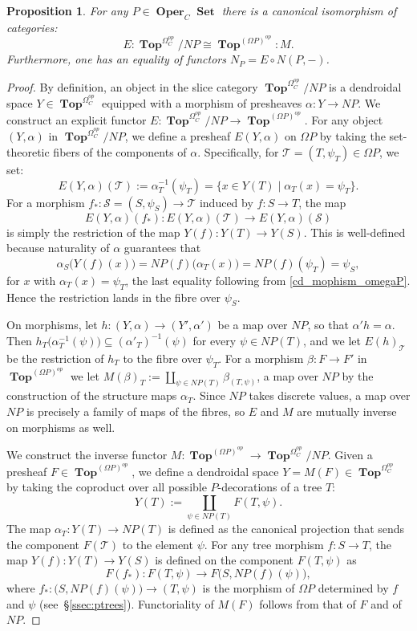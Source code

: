 \documentclass{amsart}
\newtheorem{proposition}[formula]{Proposition}
\theoremstyle{definition}
\theoremstyle{remark}
\newcommand{\lb}{\lbrace}
\newcommand{\rb}{\rbrace}
\DeclareMathOperator{\Top}{\mathbf{Top}}
\DeclareMathOperator{\Set}{\mathbf{Set}}
\DeclareMathOperator{\Oper}{\mathbf{Oper}}
\newcommand{\rcolon}{\mathrel{}\colon\!}
\begin{document}
	\begin{proposition}\label{pr:algneriso}
		For any $P\in\Oper_{C}\Set$ there is a canonical isomorphism of categories:
		\[
			E\colon \Top^{\Omega^{op}_{C}} / NP \cong \Top^{(\Omega 	P)^{op}}\rcolon M.
		\]	
		Furthermore, one has an equality of functors $N_{P}=E\circ N(P,-)$.
	\end{proposition}
	\begin{proof}
	By definition, an object in the slice category $\Top^{\Omega^{op}_{C}} / NP$ is a dendroidal space $Y\in \Top^{\Omega_{C}^{op}}$ equipped with a morphism of presheaves $\alpha\colon Y \to NP$. 
	We construct an explicit functor $E\colon \Top^{\Omega_{C}^{op}} / NP \to \Top^{(\Omega P)^{op}}$. 
	For any object $(Y, \alpha)$ in $\Top^{\Omega_{C}^{op}} / NP$, we define a presheaf $E(Y,\alpha)$ on $\Omega P$ by taking the set-theoretic fibers of the components of $\alpha$. 
	Specifically, for $\mathcal{T}=(T, \psi_{T}) \in \Omega P$, we set:
	\[
		E(Y,\alpha)(\mathcal{T}) := 	\alpha_T^{-1}(\psi_{T}) = \lb x \in 	Y(T) \mid \alpha_T(x) = \psi_{T} \rb.
	\]
	For a morphism $f_{*}\colon \mathcal{S}=(S,\psi_{S}) \to \mathcal{T}$ induced by $f\colon S\to T$, the map 
	\[
		E(Y,\alpha)(f_{*})\colon E(Y,\alpha)(\mathcal{T}) \to E(Y,\alpha)(\mathcal{S})
	\] 
	is simply the restriction of the map $Y(f)\colon Y(T) \to Y(S)$. 
	This is well-defined because naturality of $\alpha$ guarantees that 
	\[
		\alpha_S\bigl(Y(f)(x)\bigr)=NP(f)\bigl(\alpha_T(x)\bigr)=NP(f)(\psi_T)=\psi_S,
	\]
	for $x$ with $\alpha_T(x)=\psi_T$, the last equality following from \eqref{cd_mophism_omegaP}. 
	Hence the
	restriction lands in the fibre over $\psi_S$.
	
	On morphisms, let $h\colon (Y,\alpha)\to (Y',\alpha')$ be a map over $NP$, so
	that $\alpha'h=\alpha$. 
	Then $h_T\bigl(\alpha_T^{-1}(\psi)\bigr)\subseteq
	(\alpha'_T)^{-1}(\psi)$ for every $\psi\in NP(T)$, and we let
	$E(h)_{\mathcal{T}}$ be the restriction of $h_T$ to the fibre over $\psi_T$.
	For a morphism $\beta\colon F\to F'$ in $\Top^{(\Omega P)^{op}}$ we let
	$M(\beta)_T:=\coprod_{\psi\in NP(T)}\beta_{(T,\psi)}$, a map over $NP$ by the
	construction of the structure maps $\alpha_T$. 
	Since $NP$ takes discrete
	values, a map over $NP$ is precisely a family of maps of the fibres, so $E$
	and $M$ are mutually inverse on morphisms as well.
	
	We construct the inverse functor $M\colon \Top^{(\Omega P)^{op}} \to \Top^{\Omega^{op}_{C}} / NP$. 
	Given a presheaf $F \in \Top^{(\Omega P)^{op}}$, we define a dendroidal space $Y = M(F)\in \Top^{\Omega_{C}^{op}}$ by taking the coproduct over all possible $P$-decorations of a tree $T$:
	\[
		Y(T) := \coprod_{\psi \in NP(T)} F(T, 	\psi).
	\]
	The map $\alpha_T\colon Y(T) \to NP(T)$ is defined as the canonical projection that sends the component $F(\mathcal{T})$ to the element $\psi$. 
	For any tree morphism $f\colon S \to T$, the map $Y(f)\colon Y(T)\to Y(S)$ is defined on the component $F(T,\psi)$ as
	\[
		F(f_*)\colon F(T,\psi)\longrightarrow 	F\bigl(S,NP(f)(\psi)\bigr),
	\]
	where $f_*\colon \bigl(S,NP(f)(\psi)\bigr)\to (T,\psi)$ is the morphism of
	$\Omega P$ determined by $f$ and $\psi$ (see~\S\ref{ssec:ptrees}). 
	Functoriality
	of $M(F)$ follows from that of $F$ and of $NP$.
	

\end{proof}
\end{document}
